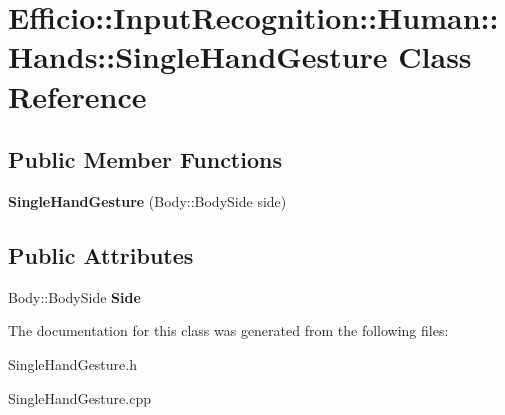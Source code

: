 \hypertarget{class_efficio_1_1_input_recognition_1_1_human_1_1_hands_1_1_single_hand_gesture}{}\section{Efficio\+:\+:Input\+Recognition\+:\+:Human\+:\+:Hands\+:\+:Single\+Hand\+Gesture Class Reference}
\label{class_efficio_1_1_input_recognition_1_1_human_1_1_hands_1_1_single_hand_gesture}
\subsection*{Public Member Functions}
\begin{DoxyCompactItemize}
\item 
\hypertarget{class_efficio_1_1_input_recognition_1_1_human_1_1_hands_1_1_single_hand_gesture_a63a8fc2546dc1a7e5962eb09de469f34}{}\label{class_efficio_1_1_input_recognition_1_1_human_1_1_hands_1_1_single_hand_gesture_a63a8fc2546dc1a7e5962eb09de469f34} 
{\bfseries Single\+Hand\+Gesture} (Body\+::\+Body\+Side side)
\end{DoxyCompactItemize}
\subsection*{Public Attributes}
\begin{DoxyCompactItemize}
\item 
\hypertarget{class_efficio_1_1_input_recognition_1_1_human_1_1_hands_1_1_single_hand_gesture_ad46d8585b784c4e9c4425e813fab2d5b}{}\label{class_efficio_1_1_input_recognition_1_1_human_1_1_hands_1_1_single_hand_gesture_ad46d8585b784c4e9c4425e813fab2d5b} 
Body\+::\+Body\+Side {\bfseries Side}
\end{DoxyCompactItemize}


The documentation for this class was generated from the following files\+:\begin{DoxyCompactItemize}
\item 
Single\+Hand\+Gesture.\+h\item 
Single\+Hand\+Gesture.\+cpp\end{DoxyCompactItemize}

